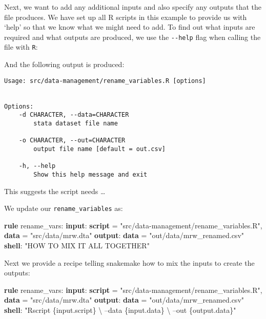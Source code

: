 \documentclass[]{book}
\newenvironment{Shaded}{\begin{snugshade}}{\end{snugshade}}
\newcommand{\KeywordTok}[1]{\textcolor[rgb]{0.13,0.29,0.53}{\textbf{{#1}}}}
\newcommand{\StringTok}[1]{\textcolor[rgb]{0.31,0.60,0.02}{{#1}}}
\newcommand{\NormalTok}[1]{{#1}}
\theoremstyle{definition}
\theoremstyle{definition}
\theoremstyle{definition}
\theoremstyle{remark}
\begin{document}
Next, we want to add any additional inputs and also specify any outputs
that the file produces. We have set up all R scripts in this example to
provide us with `help' so that we know what we might need to add. To
find out what inputs are required and what outputs are produced, we use
the \texttt{-\/-help} flag when calling the file with \texttt{R}:

\begin{Shaded}
\end{Shaded}

And the following output is produced:

\begin{verbatim}
Usage: src/data-management/rename_variables.R [options]


Options:
    -d CHARACTER, --data=CHARACTER
        stata dataset file name

    -o CHARACTER, --out=CHARACTER
        output file name [default = out.csv]

    -h, --help
        Show this help message and exit
\end{verbatim}

This suggests the script needs \ldots{}

We update our \texttt{rename\_variables} as:

\begin{Shaded}
\begin{Highlighting}[]
\KeywordTok{rule} \NormalTok{rename_vars:}
    \KeywordTok{input}\NormalTok{:}
        \KeywordTok{script} \NormalTok{= }\StringTok{"src/data-management/rename_variables.R"}\NormalTok{,}
        \KeywordTok{data}   \NormalTok{= }\StringTok{"src/data/mrw.dta"}
    \KeywordTok{output}\NormalTok{:}
        \KeywordTok{data} \NormalTok{= }\StringTok{"out/data/mrw_renamed.csv"}
    \KeywordTok{shell}\NormalTok{:}
        \StringTok{"HOW TO MIX IT ALL TOGETHER"}
\end{Highlighting}
\end{Shaded}

Next we provide a recipe telling snakemake how to mix the inputs to
create the outputs:

\begin{Shaded}
\begin{Highlighting}[]
\KeywordTok{rule} \NormalTok{rename_vars:}
    \KeywordTok{input}\NormalTok{:}
        \KeywordTok{script} \NormalTok{= }\StringTok{"src/data-management/rename_variables.R"}\NormalTok{,}
        \KeywordTok{data}   \NormalTok{= }\StringTok{"src/data/mrw.dta"}
    \KeywordTok{output}\NormalTok{:}
        \KeywordTok{data} \NormalTok{= }\StringTok{"out/data/mrw_renamed.csv"}
    \KeywordTok{shell}\NormalTok{:}
        \StringTok{"Rscript \{input.script\} \textbackslash{}}
\StringTok{            --data \{input.data\} \textbackslash{}}
\StringTok{            --out \{output.data\}"}
\end{Highlighting}
\end{Shaded}
\end{document}

